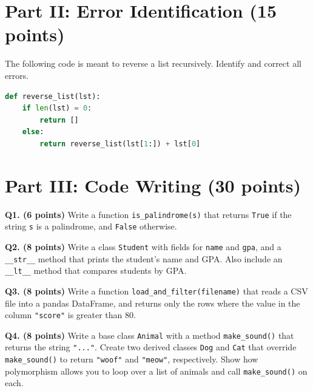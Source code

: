 \documentclass[12pt]{article}
\begin{document}
\newpage
\section*{Part II: Error Identification (15 points)}

The following code is meant to reverse a list recursively. Identify and correct all errors.

\begin{lstlisting}[language=Python]
def reverse_list(lst):
    if len(lst) = 0:
        return []
    else:
        return reverse_list(lst[1:]) + lst[0]
\end{lstlisting}

\vspace{3in}

\newpage
\section*{Part III: Code Writing (30 points)}

\textbf{Q1. (6 points)}  
Write a function \texttt{is\_palindrome(s)} that returns \texttt{True} if the string \texttt{s} is a palindrome, and \texttt{False} otherwise.

\vspace{2in}
\newpage

\textbf{Q2. (8 points)}  
Write a class \texttt{Student} with fields for \texttt{name} and \texttt{gpa}, and a \texttt{\_\_str\_\_} method that prints the student’s name and GPA. Also include an \texttt{\_\_lt\_\_} method that compares students by GPA.

\vspace{2.5in}
\newpage

\textbf{Q3. (8 points)}  
Write a function \texttt{load\_and\_filter(filename)} that reads a CSV file into a pandas DataFrame, and returns only the rows where the value in the column \texttt{"score"} is greater than 80.

\vspace{2.5in}
\newpage

\textbf{Q4. (8 points)}  
Write a base class \texttt{Animal} with a method \texttt{make\_sound()} that returns the string \texttt{"..."}. Create two derived classes \texttt{Dog} and \texttt{Cat} that override \texttt{make\_sound()} to return \texttt{"woof"} and \texttt{"meow"}, respectively. Show how polymorphism allows you to loop over a list of animals and call \texttt{make\_sound()} on each.

\vspace{3in}
\newpage
\end{document}
